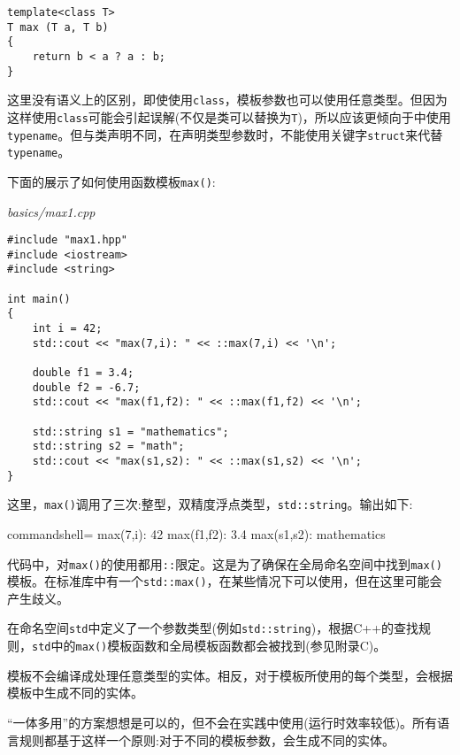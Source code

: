\begin{lstlisting}[style=styleCXX]
template<class T>
T max (T a, T b)
{
	return b < a ? a : b;
}
\end{lstlisting}

这里没有语义上的区别，即使使用\texttt{class}，模板参数也可以使用任意类型。但因为这样使用\texttt{class}可能会引起误解(不仅是类可以替换为\texttt{T})，所以应该更倾向于中使用\texttt{typename}。但与类声明不同，在声明类型参数时，不能使用关键字\texttt{struct}来代替\texttt{typename}。


下面的展示了如何使用函数模板\texttt{max()}:

\noindent
\textit{basics/max1.cpp}
\begin{lstlisting}[style=styleCXX]
#include "max1.hpp"
#include <iostream>
#include <string>

int main()
{
	int i = 42;
	std::cout << "max(7,i): " << ::max(7,i) << '\n';
	
	double f1 = 3.4;
	double f2 = -6.7;
	std::cout << "max(f1,f2): " << ::max(f1,f2) << '\n';
	
	std::string s1 = "mathematics";
	std::string s2 = "math";
	std::cout << "max(s1,s2): " << ::max(s1,s2) << '\n';
}
\end{lstlisting}

这里，\texttt{max()}调用了三次:整型，双精度浮点类型，\texttt{std::string}。输出如下:

\begin{tcblisting}{commandshell={}}
max(7,i): 42
max(f1,f2): 3.4
max(s1,s2): mathematics
\end{tcblisting}

代码中，对\texttt{max()}的使用都用\texttt{::}限定。这是为了确保在全局命名空间中找到\texttt{max()}模板。在标准库中有一个\texttt{std::max()}，在某些情况下可以使用，但在这里可能会产生歧义。

\begin{tcolorbox}[colback=webgreen!5!white,colframe=webgreen!75!black]
\hspace*{0.75cm}在命名空间\texttt{std}中定义了一个参数类型(例如\texttt{std::string})，根据C++的查找规则，\texttt{std}中的\texttt{max()}模板函数和全局模板函数都会被找到(参见附录C)。
\end{tcolorbox}

模板不会编译成处理任意类型的实体。相反，对于模板所使用的每个类型，会根据模板中生成不同的实体。

\begin{tcolorbox}[colback=webgreen!5!white,colframe=webgreen!75!black]
\hspace*{0.75cm}“一体多用”的方案想想是可以的，但不会在实践中使用(运行时效率较低)。所有语言规则都基于这样一个原则:对于不同的模板参数，会生成不同的实体。
\end{tcolorbox}

